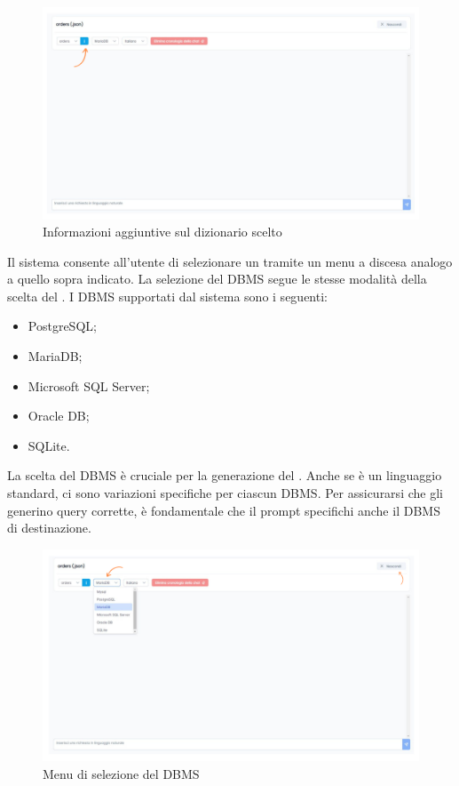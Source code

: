 \begin{figure}[H]
  \centering
  \includegraphics[width=1\textwidth]{assets/info_dizionario.png}
  \caption{Informazioni aggiuntive sul dizionario scelto}
\end{figure}


\par Il sistema consente all'utente di selezionare un  tramite un menu a discesa analogo a quello sopra indicato. La selezione del DBMS segue le stesse modalità della scelta del . I DBMS supportati dal sistema sono i seguenti:
\begin{itemize}
  \item PostgreSQL;
  \item MariaDB;
  \item Microsoft SQL Server;
  \item Oracle DB;
  \item SQLite.
\end{itemize}

\vspace{0.5\baselineskip}
\par La scelta del DBMS è cruciale per la generazione del . Anche se  è un linguaggio standard, ci sono variazioni specifiche per ciascun DBMS. Per assicurarsi che gli  generino query corrette, è fondamentale che il prompt specifichi anche il DBMS di destinazione.

\begin{figure}[H]
  \centering
  \includegraphics[width=1\textwidth]{assets/cambio_dbms.png}
  \caption{Menu di selezione del DBMS}
\end{figure}

